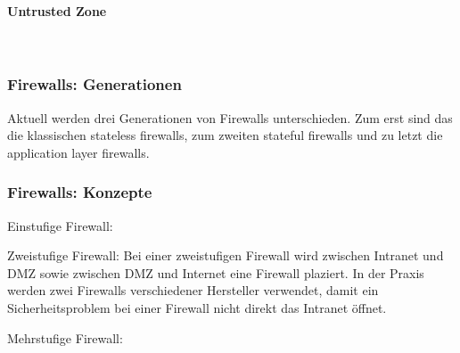 \paragraph{Untrusted Zone}~\\

\subsubsection{Firewalls: Generationen}

Aktuell werden drei Generationen von Firewalls unterschieden. Zum erst sind das die klassischen stateless firewalls, zum zweiten stateful firewalls und zu letzt die application layer firewalls.

\subsubsection{Firewalls: Konzepte}

Einstufige Firewall:

Zweistufige Firewall: Bei einer zweistufigen Firewall wird zwischen Intranet und DMZ sowie zwischen DMZ und Internet eine Firewall plaziert. In der Praxis werden zwei Firewalls verschiedener Hersteller verwendet, damit ein Sicherheitsproblem bei einer Firewall nicht direkt das Intranet öffnet.

Mehrstufige Firewall:
